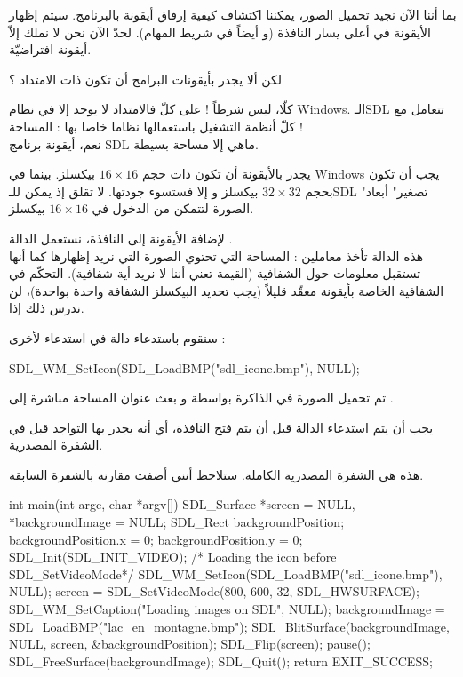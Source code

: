 بما أننا الآن نجيد تحميل الصور، يمكننا اكتشاف كيفية إرفاق أيقونة بالبرنامج. سيتم إظهار الأيقونة في أعلى يسار النافذة (و أيضاً في شريط المهام). لحدّ الآن نحن لا نملك إلاّ أيقونة افتراضيّة.

\begin{question}
لكن ألا يجدر بأيقونات البرامج أن تكون ذات الامتداد
 ؟
\end{question}

كلّا، ليس شرطاً ! على كلّ فالامتداد
لا يوجد إلا في نظام
\textenglish{Windows}.
 الـ\textenglish{SDL}
تتعامل مع كلّ أنظمة التشغيل باستعمالها نظاما خاصا بها : المساحة !\\
نعم، أيقونة برنامج 
\textenglish{SDL}
ماهي إلا مساحة بسيطة.

\begin{warning}
يجدر بالأيقونة أن تكون ذات حجم 
$16 \times 16$
بيكسلز. بينما في 
\textenglish{Windows}
يجب أن تكون بحجم
$32 \times 32$
بيكسلز و إلا فستسوء جودتها. لا تقلق إذ يمكن للـ\textenglish{SDL}
"تصغير" أبعاد الصورة لتتمكن من الدخول في 
$16 \times 16$
بيكسلز.
\end{warning}

لإضافة الأيقونة إلى النافذة، نستعمل الدالة 
.\\
هذه الدالة تأخذ معاملين : المساحة التي تحتوي الصورة التي نريد إظهارها كما أنها تستقبل معلومات حول الشفافية (القيمة 
تعني أننا لا نريد أية شفافية). التحكّم في الشفافية الخاصة بأيقونة معقّد قليلاً (يجب تحديد البيكسلز الشفافة واحدة بواحدة)، لن ندرس ذلك إذا.

سنقوم باستدعاء دالة في استدعاء لأخرى :

\begin{Csource}
SDL_WM_SetIcon(SDL_LoadBMP("sdl_icone.bmp"), NULL);
\end{Csource}
 
تم تحميل الصورة في الذاكرة بواسطة
و بعث عنوان المساحة مباشرة إلى
.

\begin{critical}
يجب أن يتم استدعاء الدالة
قبل أن يتم فتح النافذة، أي أنه يجدر بها التواجد قبل
في الشفرة المصدرية.
\end{critical}

هذه هي الشفرة المصدرية الكاملة. ستلاحظ أنني أضفت
مقارنة بالشفرة السابقة.

\begin{Csource}
int main(int argc, char *argv[])
{
	SDL_Surface *screen = NULL, *backgroundImage = NULL;
	SDL_Rect backgroundPosition;
	backgroundPosition.x = 0;
	backgroundPosition.y = 0;
	SDL_Init(SDL_INIT_VIDEO);
	/* Loading the icon before SDL_SetVideoMode*/
	SDL_WM_SetIcon(SDL_LoadBMP("sdl_icone.bmp"), NULL);
	screen = SDL_SetVideoMode(800, 600, 32, SDL_HWSURFACE);
	SDL_WM_SetCaption("Loading images on SDL", NULL);
	backgroundImage = SDL_LoadBMP("lac_en_montagne.bmp");
	SDL_BlitSurface(backgroundImage, NULL, screen, &backgroundPosition);
	SDL_Flip(screen);
	pause();
	SDL_FreeSurface(backgroundImage);
	SDL_Quit();
	return EXIT_SUCCESS;
}
\end{Csource}

